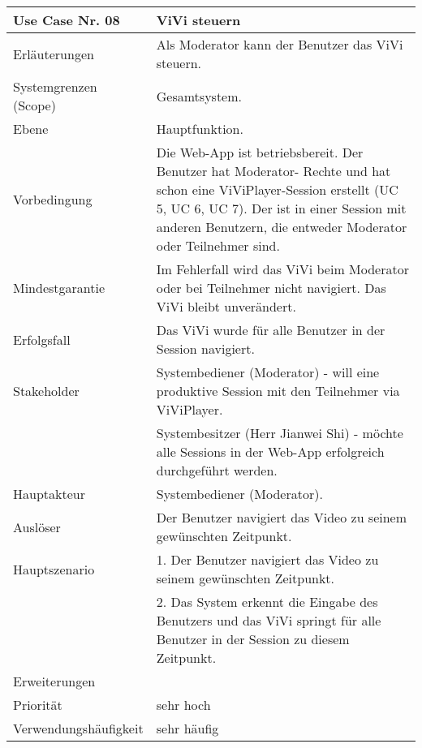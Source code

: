 \begin{tabularx}{\linewidth}{|l|X|}
	\hline
	Use Case Nr. 08			& \textbf{ViVi steuern} \\ \hline
	Erläuterungen			& Als Moderator kann der Benutzer das ViVi steuern. \\ \hline
	Systemgrenzen (Scope)	& Gesamtsystem. \\ \hline
	Ebene					& Hauptfunktion. \\ \hline
	Vorbedingung			& Die Web-App ist betriebsbereit. Der Benutzer hat Moderator-
							  Rechte und hat schon eine ViViPlayer-Session erstellt (UC 5, UC 6, UC 7). Der ist in einer Session mit anderen Benutzern, die entweder Moderator oder Teilnehmer sind. \\ \hline
	Mindestgarantie			& Im Fehlerfall wird das ViVi beim Moderator oder bei Teilnehmer 
							  nicht navigiert. Das ViVi bleibt unverändert. \\ \hline
	Erfolgsfall 			& Das ViVi wurde für alle Benutzer in der Session navigiert. 
							  \\ \hline
	Stakeholder				& Systembediener (Moderator) - will eine produktive Session mit den 
							  Teilnehmer via ViViPlayer. \\
							& Systembesitzer (Herr Jianwei Shi) - möchte alle Sessions in der 
							  Web-App erfolgreich durchgeführt werden. \\ \hline
	Hauptakteur				& Systembediener (Moderator). \\ \hline
	Auslöser				& Der Benutzer navigiert das Video zu seinem gewünschten 
							  Zeitpunkt. \\ \hline	
	Hauptszenario			& 1. Der Benutzer navigiert das Video zu seinem gewünschten
							  Zeitpunkt. \\
							& 2. Das System erkennt die Eingabe des Benutzers und
							  das ViVi springt für alle Benutzer in der Session zu diesem Zeitpunkt.
							  \\ \hline
	Erweiterungen			&  \\ \hline
	Priorität				& sehr hoch \\ \hline
	Verwendungshäufigkeit	& sehr häufig \\ \hline
\end{tabularx}